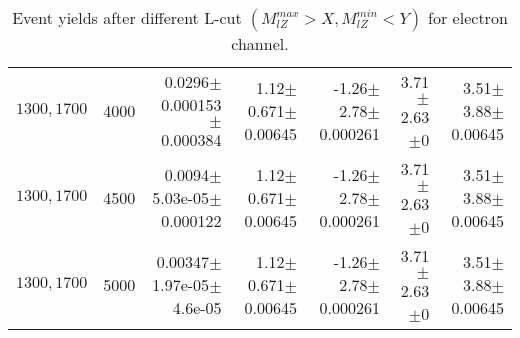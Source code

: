 \documentclass[]{article}
\begin{document}
\begin{table}
\begin{center}
{\begin{tabular}{ |r|r|r|r|r|r|r|}
$1300, 1700$ & 4000 & 0.0296$\pm$0.000153$\pm$0.000384 & 1.12$\pm$0.671$\pm$0.00645 & -1.26$\pm$2.78$\pm$0.000261 & 3.71$\pm$2.63$\pm$0 & 3.51$\pm$3.88$\pm$0.00645 \\
$1300, 1700$ & 4500 & 0.0094$\pm$5.03e-05$\pm$0.000122 & 1.12$\pm$0.671$\pm$0.00645 & -1.26$\pm$2.78$\pm$0.000261 & 3.71$\pm$2.63$\pm$0 & 3.51$\pm$3.88$\pm$0.00645 \\
$1300, 1700$ & 5000 & 0.00347$\pm$1.97e-05$\pm$4.6e-05 & 1.12$\pm$0.671$\pm$0.00645 & -1.26$\pm$2.78$\pm$0.000261 & 3.71$\pm$2.63$\pm$0 & 3.51$\pm$3.88$\pm$0.00645 \\
\hline 
\end{tabular}
}
\end{center}
\caption{Event yields after different L-cut $(M_{lZ}^{max} > X, M_{lZ}^{min} < Y)$ for electron channel.}
\end{table}
\end{document}
